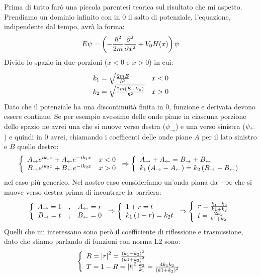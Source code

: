 Prima di tutto far\`o una piccola parentesi teorica sul risultato che mi aspetto. Prendiamo un dominio infinito con in 0 il salto di potenziale, l'equazione, indipendente dal tempo, avr\`a la forma:
\begin{equation}
  E\psi = \lrt{-\frac{\hbar^2}{2m}\pde{^2}{x^2}+V_0H(x)}\psi
\end{equation}
Divido lo spazio in due porzioni ($x<0$ e $x>0$) in cui:
\begin{equation}\label{eq:Ks}
  \begin{array}{lr}
    k_1 = \sqrt\frac{2m E}{\hbar^2}&x<0\\
    k_2 = \sqrt\frac{2m \lrt{E-V_0}}{\hbar^2}&x>0
  \end{array}
\end{equation}
Dato che il potenziale ha una discontinuit\`a finita in $0$, funzione e derivata devono essere continue. Se per esempio avessimo delle onde piane in ciascuna porzione dello spazio ne avrei una che si muove verso destra ($\psi_\to$) e una verso sinistra ($\psi_\from$) e quindi in 0 avrei, chiamando i coefficenti delle onde piane $A$ per il lato sinistro e $B$ quello destro:
\begin{equation}
  \lr\{.{\begin{array}{lr}
      A_\to e^{ik_1x} + A_\from e^{-ik_1x}	&	x<0\\
      B_\to e^{ik_2x} + B_\from e^{-ik_2x}	&	x>0
  \end{array}}\Rightarrow
  \lr\{.{\begin{array}{l}
      A_\to+A_\from = B_\to+B_\from\\
      k_1\lrt{A_\to-A_\from} = k_2\lrt{B_\to-B_\from}
  \end{array}}
\end{equation}
nel caso pi\`u generico. Nel nostro caso consideriamo un'onda piana da $-\infty$ che si muove verso destra prima di incontrare la barriera:
\begin{equation}
  \lr\{.{\begin{array}{ccc}
      A_\to = 1&,&
      A_\from = r\\
      B_\to = t&,&
      B_\from=0
  \end{array}} \Rightarrow\lr\{.{\begin{array}{l}
      1+r = t\\
      k_1 \lrt{1-r} = k_2 t
  \end{array}} \Rightarrow\lr\{.{\begin{array}{l}
      r = \frac{k_1-k_2}{k1+k_2}\\
      t = \frac{2k_1}{k1+k_2}
  \end{array}}
\end{equation}
Quelli che mi interessano sono per\`o il coefficiente di riflessione e trasmissione, dato che stiamo parlando di funzioni con norma L2 sono:
\begin{equation}
  \lr\{.{\begin{array}{l}
      R = \lr||{r}^2 = \frac{\lrt{k_1-k_2}^2}{\lrt{k1+k_2}^2}\\
      T = 1-R = \lr||{t}^2\frac{k_2}{k_1} = \frac{4 k_1 k_2}{\lrt{k1+k_2}^2}
  \end{array}}
\end{equation}

